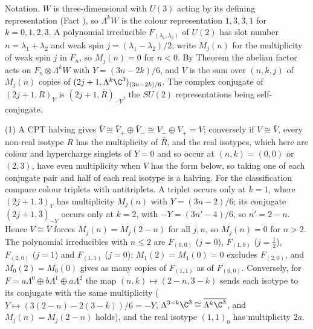 Notation. $W$ is three-dimensional with $U(3)$ acting by its defining representation (Fact ), so $\Lambda^{k}W$ is the colour representation $1, 3, \bar{3}, 1$ for $k = 0, 1, 2, 3$. A polynomial irreducible $F_{(\lambda_{1}, \lambda_{2})}$ of $U(2)$ has slot number $n = \lambda_{1} + \lambda_{2}$ and weak spin $j = (\lambda_{1} - \lambda_{2})/2$; write $M_{j}(n)$ for the multiplicity of weak spin $j$ in $F_{n}$, so $M_{j}(n) = 0$ for $n < 0$. By Theorem  the abelian factor acts on $F_{n} \otimes \Lambda^{k}W$ with $Y = (3n - 2k)/6$, and $V$ is the sum over $(n, k, j)$ of $M_{j}(n)$ copies of $(2j + 1, \Lambda^{k}\C^{3})_{(3n - 2k)/6}$. The complex conjugate of $(2j + 1, R)_{Y}$ is $(2j + 1, \bar{R})_{-Y}$, the $SU(2)$ representations being self-conjugate.

(1) A CPT halving gives $\bar{V} \cong \bar{V}_{+} \oplus \bar{V}_{-} \cong V_{-} \oplus V_{+} = V$; conversely if $V \cong \bar{V}$, every non-real isotype $R$ has the multiplicity of $\bar{R}$, and the real isotypes, which here are colour and hypercharge singlets of $Y = 0$ and so occur at $(n, k) = (0, 0)$ or $(2, 3)$, have even multiplicity when $V$ has the form below, so taking one of each conjugate pair and half of each real isotype is a halving. For the classification compare colour triplets with antitriplets. A triplet occurs only at $k = 1$, where $(2j + 1, 3)_{Y}$ has multiplicity $M_{j}(n)$ with $Y = (3n - 2)/6$; its conjugate $(2j + 1, \bar{3})_{-Y}$ occurs only at $k = 2$, with $-Y = (3n' - 4)/6$, so $n' = 2 - n$. Hence $V \cong \bar{V}$ forces $M_{j}(n) = M_{j}(2 - n)$ for all $j, n$, so $M_{j}(n) = 0$ for $n > 2$. The polynomial irreducibles with $n \le 2$ are $F_{(0,0)}$ ($j = 0$), $F_{(1,0)}$ ($j = \tfrac12$), $F_{(2,0)}$ ($j = 1$) and $F_{(1,1)}$ ($j = 0$); $M_{1}(2) = M_{1}(0) = 0$ excludes $F_{(2,0)}$, and $M_{0}(2) = M_{0}(0)$ gives as many copies of $F_{(1,1)}$ as of $F_{(0,0)}$. Conversely, for $F = a\Lambda^{0} \oplus b\Lambda^{1} \oplus a\Lambda^{2}$ the map $(n, k) \mapsto (2 - n, 3 - k)$ sends each isotype to its conjugate with the same multiplicity ($Y \mapsto (3(2 - n) - 2(3 - k))/6 = -Y$, $\Lambda^{3 - k}\C^{3} \cong \overline{\Lambda^{k}\C^{3}}$, and $M_{j}(n) = M_{j}(2 - n)$ holds), and the real isotype $(1,1)_{0}$ has multiplicity $2a$.

